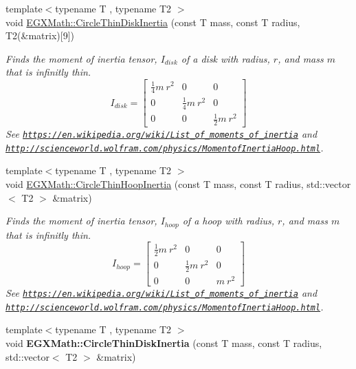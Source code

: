 \begin{DoxyCompactItemize}
{\footnotesize template$<$typename T , typename T2 $>$ }\\void \mbox{\hyperlink{group___e_g_x_math-_geometry-2_d-_circle_ga4d5e95f0986ab5e760679adeccb53181}{E\+G\+X\+Math\+::\+Circle\+Thin\+Disk\+Inertia}} (const T mass, const T radius, T2(\&matrix)\mbox{[}9\mbox{]})
\begin{DoxyCompactList}\small\item\em Finds the moment of inertia tensor, $I_{disk}$ of a disk with radius, $r$, and mass $m$ that is infinitly thin. \[ I_{disk}=\begin{bmatrix} \frac{1}{4}m\ r^2 & 0 & 0\\ 0 & \frac{1}{4}m\ r^2 & 0\\ 0 & 0 & \frac{1}{2}m\ r^2 \end{bmatrix} \] See \href{https://en.wikipedia.org/wiki/List_of_moments_of_inertia}{\tt https\+://en.\+wikipedia.\+org/wiki/\+List\+\_\+of\+\_\+moments\+\_\+of\+\_\+inertia} and \href{http://scienceworld.wolfram.com/physics/MomentofInertiaHoop.html}{\tt http\+://scienceworld.\+wolfram.\+com/physics/\+Momentof\+Inertia\+Hoop.\+html}. \end{DoxyCompactList}\item 
{\footnotesize template$<$typename T , typename T2 $>$ }\\void \mbox{\hyperlink{group___e_g_x_math-_geometry-2_d-_circle_ga902bfe249e733c8d2917600cc4a3392b}{E\+G\+X\+Math\+::\+Circle\+Thin\+Hoop\+Inertia}} (const T mass, const T radius, std\+::vector$<$ T2 $>$ \&matrix)
\begin{DoxyCompactList}\small\item\em Finds the moment of inertia tensor, $I_{hoop}$ of a hoop with radius, $r$, and mass $m$ that is infinitly thin. \[ I_{hoop}=\begin{bmatrix} \frac{1}{2}m\ r^2 & 0 & 0\\ 0 & \frac{1}{2}m\ r^2 & 0\\ 0 & 0 & m\ r^2 \end{bmatrix} \] See \href{https://en.wikipedia.org/wiki/List_of_moments_of_inertia}{\tt https\+://en.\+wikipedia.\+org/wiki/\+List\+\_\+of\+\_\+moments\+\_\+of\+\_\+inertia} and \href{http://scienceworld.wolfram.com/physics/MomentofInertiaHoop.html}{\tt http\+://scienceworld.\+wolfram.\+com/physics/\+Momentof\+Inertia\+Hoop.\+html}. \end{DoxyCompactList}\item 
\mbox{\label{group___e_g_x_math-_geometry-2_d-_circle_ga2f2dedb5c96a67a98d3434ef3dc81b1d}} 
{\footnotesize template$<$typename T , typename T2 $>$ }\\void {\bfseries E\+G\+X\+Math\+::\+Circle\+Thin\+Disk\+Inertia} (const T mass, const T radius, std\+::vector$<$ T2 $>$ \&matrix)
\end{DoxyCompactItemize}


